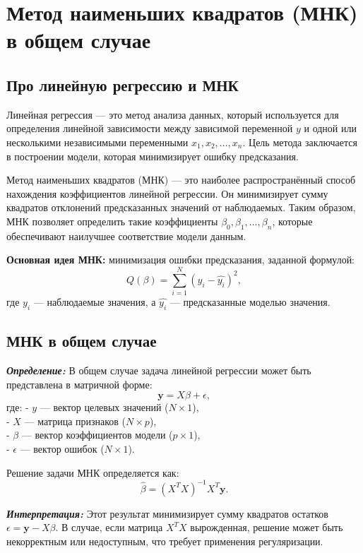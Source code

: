 \newpage

\section{Метод наименьших квадратов (МНК) в общем случае}

\subsection{Про линейную регрессию и МНК}

Линейная регрессия — это метод анализа данных, который используется для определения линейной зависимости между зависимой переменной \(y\) и одной или несколькими независимыми переменными \(x_1, x_2, \dots, x_n\). Цель метода заключается в построении модели, которая минимизирует ошибку предсказания.

Метод наименьших квадратов (МНК) — это наиболее распространённый способ нахождения коэффициентов линейной регрессии. Он минимизирует сумму квадратов отклонений предсказанных значений от наблюдаемых. Таким образом, МНК позволяет определить такие коэффициенты \( \beta_0, \beta_1, \dots, \beta_n \), которые обеспечивают наилучшее соответствие модели данным.

\textbf{Основная идея МНК:} минимизация ошибки предсказания, заданной формулой:
\[
Q(\beta) = \sum_{i=1}^{N} (y_i - \hat{y_i})^2,
\]
где \(y_i\) — наблюдаемые значения, а \( \hat{y_i} \) — предсказанные моделью значения.

\subsection{МНК в общем случае}

\textbf{\textit{Определение:}}
В общем случае задача линейной регрессии может быть представлена в матричной форме:
\[
\mathbf{y} = X \beta + \epsilon,
\]
где:
- \(y\) — вектор целевых значений (\(N \times 1\)), \\
- \(X\) — матрица признаков (\(N \times p\)), \\
- \(\beta\) — вектор коэффициентов модели (\(p \times 1\)), \\
- \(\epsilon\) — вектор ошибок (\(N \times 1\)).

Решение задачи МНК определяется как:
\[
\hat{\beta} = (X^T X)^{-1} X^T \mathbf{y}.
\]

\textbf{\textit{Интерпретация:}}
Этот результат минимизирует сумму квадратов остатков \(\epsilon = \mathbf{y} - X\beta\). В случае, если матрица \(X^T X\) вырожденная, решение может быть некорректным или недоступным, что требует применения регуляризации.

